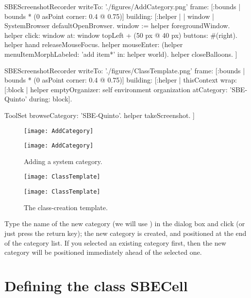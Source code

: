 \documentclass[a4paper,10pt,twoside]{book}
\begin{document}
\begin{ExecuteSmalltalkScript}
SBEScreenshotRecorder writeTo: './figures/AddCategory.png' frame: [:bounds | bounds * (0 asPoint corner: 0.4 @ 0.75)] building: [:helper |
	| window |
	SystemBrowser defaultOpenBrowser.
	window := helper foregroundWindow.
	helper click: window at: window topLeft + (50 px @ 40 px) buttons: #(right).
	helper hand releaseMouseFocus.
	helper mouseEnter: (helper menuItemMorphLabeled: 'add item*' in: helper world).
	helper closeBalloons.
]
\end{ExecuteSmalltalkScript}
\begin{ExecuteSmalltalkScript}
SBEScreenshotRecorder writeTo: './figures/ClassTemplate.png' frame: [:bounds | bounds * (0 asPoint corner: 0.4 @ 0.75)] building: [:helper |
	thisContext wrap: [:block |
		helper emptyOrganizer: self environment organization atCategory: 'SBE-Quinto' during: block].

	ToolSet browseCategory: 'SBE-Quinto'.
	helper takeScreenshot.
]
\end{ExecuteSmalltalkScript}
\begin{figure}[htb]
\begin{minipage}[b]{0.48\textwidth}
\ifluluelse
	{\centerline {\texttt{[image: AddCategory]}}}
	{\centerline {\texttt{[image: AddCategory]}}}
	\caption{Adding a system category.
	\label{fig:addCategory}}
\end{minipage}
\hfill
\begin{minipage}[b]{0.48\textwidth}
\ifluluelse
	{\centerline {\texttt{[image: ClassTemplate]}}}
	{\centerline {\texttt{[image: ClassTemplate]}}}
	\caption{The class-creation template.
	\label{fig:classTemplate}}
\end{minipage}
\end{figure}

Type the name of the new category (we will use ) in the dialog box and click  (or just press the return key); the new category is created, and positioned at the end of the category list.
If you selected an existing category first, then the new category will be positioned immediately ahead of the selected one.

\section{Defining the class SBECell}
\end{document}
